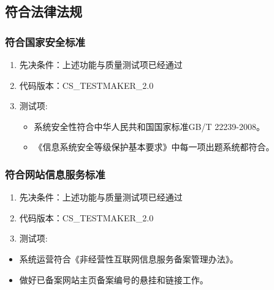 \documentclass[hyperref, a4paper]{ctexart}
\providecommand{\tightlist}{%
  \setlength{\itemsep}{0pt}\setlength{\parskip}{0pt}}
\begin{document}
\hypertarget{ux7b26ux5408ux6cd5ux5f8bux6cd5ux89c4}{%
\subsection{符合法律法规}\label{ux7b26ux5408ux6cd5ux5f8bux6cd5ux89c4}}

\hypertarget{ux7b26ux5408ux56fdux5bb6ux5b89ux5168ux6807ux51c6}{%
\subsubsection{符合国家安全标准}\label{ux7b26ux5408ux56fdux5bb6ux5b89ux5168ux6807ux51c6}}

\begin{enumerate}
\def\labelenumi{\arabic{enumi}.}
\tightlist
\item
  先决条件：上述功能与质量测试项已经通过
\item
  代码版本：CS\_TESTMAKER\_2.0
\item
  测试项:

  \begin{itemize}
  \tightlist
  \item
    系统安全性符合中华人民共和国国家标准GB/T 22239-2008。
  \item
    《信息系统安全等级保护基本要求》中每一项出题系统都符合。
  \end{itemize}
\end{enumerate}

\hypertarget{ux7b26ux5408ux7f51ux7ad9ux4fe1ux606fux670dux52a1ux6807ux51c6}{%
\subsubsection{符合网站信息服务标准}\label{ux7b26ux5408ux7f51ux7ad9ux4fe1ux606fux670dux52a1ux6807ux51c6}}

\begin{enumerate}
\def\labelenumi{\arabic{enumi}.}
\tightlist
\item
  先决条件：上述功能与质量测试项已经通过
\item
  代码版本：CS\_TESTMAKER\_2.0
\item
  测试项:
\end{enumerate}

\begin{itemize}
\tightlist
\item
  系统运营符合《非经营性互联网信息服务备案管理办法》。
\item
  做好已备案网站主页备案编号的悬挂和链接工作。
\end{itemize}
\end{document}
